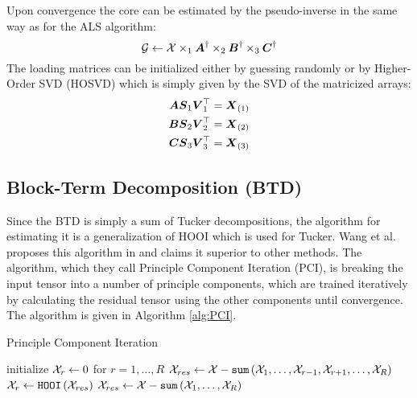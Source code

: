 Upon convergence the core can be estimated by the pseudo-inverse in the same way as for the ALS algorithm:
\begin{equation}
    \mathcal{G} \leftarrow \mathcal{X} \times_1 \boldsymbol{A}^{\dagger} \times_2 \boldsymbol{B}^{\dagger} \times_3 \boldsymbol{C}^{\dagger}
\end{equation}
The loading matrices can be initialized either by guessing randomly or by Higher-Order SVD (HOSVD) which is simply given by the SVD of the matricized arrays:
\begin{align}
    \boldsymbol{A} \boldsymbol{S}_1\boldsymbol{V}_1^{\top} &= \boldsymbol{X}_{(1)} \\
    \boldsymbol{B} \boldsymbol{S}_2\boldsymbol{V}_2^{\top} &= \boldsymbol{X}_{(2)} \\
    \boldsymbol{C} \boldsymbol{S}_3\boldsymbol{V}_3^{\top} &= \boldsymbol{X}_{(3)}
\end{align}

\subsection{Block-Term Decomposition (BTD)}
Since the BTD is simply a sum of Tucker decompositions, the algorithm for estimating it is a generalization of HOOI which is used for Tucker. Wang et al. proposes this algorithm in \cite{Wang2016} and claims it superior to other methods. The algorithm, which they call Principle Component Iteration (PCI), is breaking the input tensor into a number of principle components, which are trained iteratively by calculating the residual tensor using the other components until convergence. The algorithm is given in Algorithm \ref{alg:PCI}.
\begin{algorithm} \caption{Principle Component Iteration} \label{alg:PCI}
\begin{algorithmic}[1]
\State initialize $\mathcal{X}_r \leftarrow 0$ for $r = 1, \dots, R$
\Repeat
        \State $\mathcal{X}_{res} \leftarrow \mathcal{X} - \texttt{sum}\left( \mathcal{X}_1, \dots, \mathcal{X}_{r-1}, \mathcal{X}_{r+1},\dots, \mathcal{X}_R \right)$ 
        \State $\mathcal{X}_r \leftarrow \texttt{HOOI} \left( \mathcal{X}_{res}\right)$ 
    \EndFor
    \State $\mathcal{X}_{res} \leftarrow \mathcal{X} - \texttt{sum}\left( \mathcal{X}_1, \dots, \mathcal{X}_R \right)$
\State {}
\EndProcedure
\end{algorithmic}
\end{algorithm}

